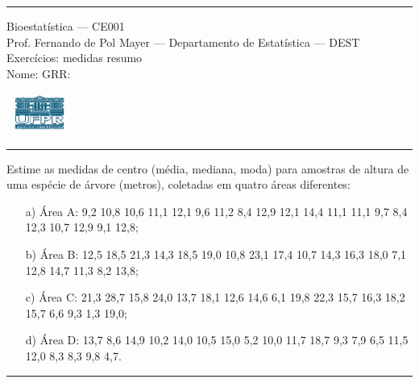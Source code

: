 \documentclass[a4paper,11pt,fleqn]{article}\usepackage[]{graphicx}\usepackage[]{color}
\theoremstyle{definition}
\begin{document}
\reversemarginpar %





\hrule
\vspace{0.3cm}

\begin{minipage}[c]{.85\textwidth}
  Bioestatística --- CE001 \\
  Prof. Fernando de Pol Mayer --- Departamento de Estatística --- DEST \\
  Exercícios: medidas resumo \\
  Nome:   \hfill GRR: \hspace{2cm}
\end{minipage}\hfill
\begin{minipage}[c]{.15\textwidth}
\flushright
\includegraphics[width=2.2cm]{../img/ufpr-logo.png}
\end{minipage}

\vspace{0.3cm}
\hrule
\vspace{0.3cm}

\begin{compactenum}[1.]
\item Estime as medidas de centro (média, mediana,
  moda) para amostras de altura de uma espécie de árvore (metros),
  coletadas em quatro áreas diferentes:
  \begin{itemize}
  \item[a)] Área A: 9,2 10,8 10,6 11,1 12,1 9,6 11,2 8,4 12,9 12,1
    14,4 11,1 11,1 9,7 8,4 12,3 10,7 12,9 9,1 12,8;
  \item[b)] Área B: 12,5 18,5 21,3 14,3 18,5 19,0 10,8 23,1 17,4 10,7
    14,3 16,3 18,0 7,1 12,8 14,7 11,3 8,2 13,8;
  \item[c)] Área C: 21,3 28,7 15,8 24,0 13,7 18,1 12,6 14,6 6,1 19,8
    22,3 15,7 16,3 18,2 15,7 6,6 9,3 1,3 19,0;
  \item[d)] Área D: 13,7 8,6 14,9 10,2 14,0 10,5 15,0 5,2 10,0 11,7
    18,7 9,3 7,9 6,5 11,5 12,0 8,3 8,3 9,8 4,7.
  \end{itemize}

\end{compactenum}

\vspace{0.3cm}
\hrule
\vspace{0.3cm}
\end{document}
